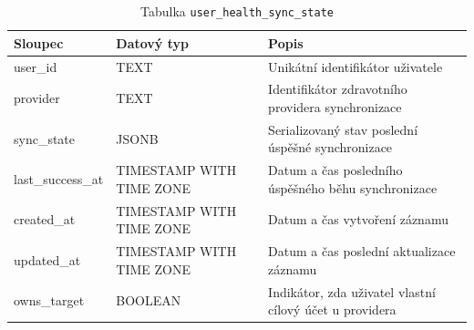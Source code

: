 \begin{table}[ht!]
    \centering
    \begin{tabularx}{\textwidth}{|l|l|L|}
        \hline
        \textbf{Sloupec}  & \textbf{Datový typ}      & \textbf{Popis}                                          \\ \hline
        user\_id          & TEXT                     & Unikátní identifikátor uživatele                        \\ \hline
        provider          & TEXT                     & Identifikátor zdravotního providera synchronizace       \\ \hline
        sync\_state       & JSONB                    & Serializovaný stav poslední úspěšné synchronizace       \\ \hline
        last\_success\_at & TIMESTAMP WITH TIME ZONE & Datum a čas posledního úspěšného běhu synchronizace     \\ \hline
        created\_at       & TIMESTAMP WITH TIME ZONE & Datum a čas vytvoření záznamu                           \\ \hline
        updated\_at       & TIMESTAMP WITH TIME ZONE & Datum a čas poslední aktualizace záznamu                \\ \hline
        owns\_target      & BOOLEAN                  & Indikátor, zda uživatel vlastní cílový účet u providera \\ \hline
    \end{tabularx}
    \caption{Tabulka \texttt{user\_health\_sync\_state}}
    \label{tab:user_health_sync_state}
\end{table}
